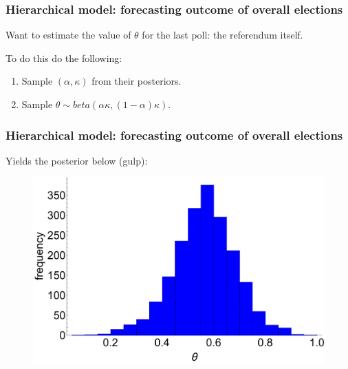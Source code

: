 \documentclass[handout]{beamer}
\begin{document}
\begin{frame}
	\frametitle{Hierarchical model: forecasting outcome of overall elections}
	 Want to estimate the value of $\theta$ for the last poll: the referendum itself.

 \vspace{0.5cm}
	
	 To do this do the following:
	
	\begin{enumerate}
		\item<4-> Sample $(\alpha,\kappa)$ from their posteriors.
		\item<5-> Sample $\theta\sim beta(\alpha\kappa,(1-\alpha)\kappa)$.
	\end{enumerate}
	
\end{frame}

\begin{frame}
	\frametitle{Hierarchical model: forecasting outcome of overall elections}
	 Yields the posterior below (gulp):
	
	\begin{figure}[ht]
		\centerline{\includegraphics[width=1\textwidth]{figures/lec6_euOverallThetaPost.pdf}}
	\end{figure}
	
\end{frame}
\end{document}
